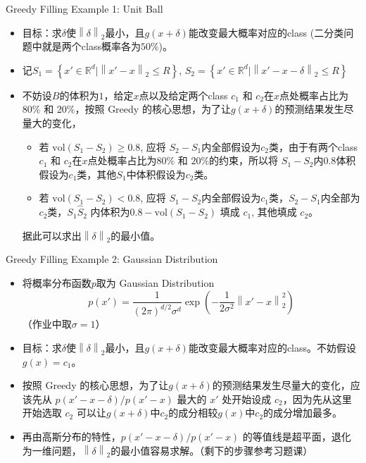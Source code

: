 \begin{frame}[fragile]{Greedy Filling Example 1: Unit Ball}
    \begin{itemize}
        \item 目标：求$\delta$使$\left\| \delta \right\|_2 $最小，且$g(x+\delta)$能改变最大概率对应的class (二分类问题中就是两个class概率各为$50\%$)。
        \item 记$S_1 = \left\{ x'\in \mathbb{R}^{d} | \left\| x' - x \right\| _2 \leqslant R \right\} $, $S_2 = \left\{ x'\in \mathbb{R}^{d} | \left\| x' - x - \delta \right\| _2 \leqslant R \right\} $
        \item 不妨设$B$的体积为$1$，给定$x$点以及给定两个class $c_1$ 和 $c_2$在$x$点处概率占比为$80\%$ 和 $20\%$，按照 Greedy 的核心思想，为了让$g(x+\delta)$的预测结果发生尽量大的变化，
        \begin{itemize}
            \item 若 $\text{vol}(S_1-S_2) \geqslant 0.8$, 应将 $S_2-S_1$内全部假设为$c_2$类，由于有两个class $c_1$ 和 $c_2$在$x$点处概率占比为$80\%$ 和 $20\%$的约束，所以将 $S_1-S_2$内$0.8$体积假设为$c_1$类，其他$S_1$中体积假设为$c_2$类。
            \item 若 $\text{vol}(S_1-S_2) < 0.8$, 应将 $S_1-S_2$内全部假设为$c_1$类，$S_2-S_1$内全部为$c_2$类，$S_1 \hat S_2$ 内体积为$0.8 - \text{vol}(S_1-S_2)$ 填成 $c_1$, 其他填成 $c_2$。
        \end{itemize}
        据此可以求出$\left\| \delta \right\|_2 $的最小值。
    \end{itemize}
\end{frame}
    
\begin{frame}[fragile]{Greedy Filling Example 2: Gaussian Distribution}
    \begin{itemize}
        \item 将概率分布函数$p$取为 Gaussian Distribution
        \[
            p(x') = \frac{1}{(2\pi)^{d/2} \sigma^d} \exp\left( -\frac{1}{2\sigma^2} \left\| x' - x \right\|_2^2 \right)
        \]
        （作业中取$\sigma = 1$）
        \item 目标：求$\delta$使$\left\| \delta \right\|_2 $最小，且$g(x+\delta)$能改变最大概率对应的class。不妨假设$g(x) = c_1$。
        \item 按照 Greedy 的核心思想，为了让$g(x+\delta)$的预测结果发生尽量大的变化，应该先从 $p(x' - x - \delta)/p(x' - x)$ 最大的 $x'$ 处开始设成 $c_2$，因为先从这里开始选取 $c_2$ 可以让$g(x+\delta)$中$c_2$的成分相较$g(x)$中$c_2$的成分增加最多。
        \item 再由高斯分布的特性，$p(x' - x - \delta)/p(x' - x)$ 的等值线是超平面，退化为一维问题，$\left\| \delta \right\|_2 $的最小值容易求解。（剩下的步骤参考习题课）
    \end{itemize}
\end{frame}
